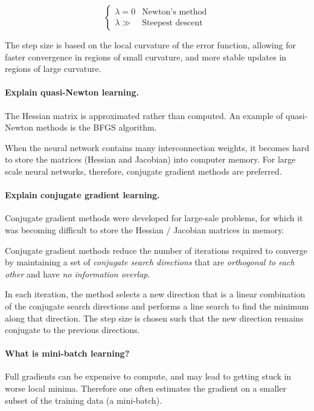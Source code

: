 $$
\begin{cases}
    \lambda = 0 & \text{Newton's method} \\
    \lambda \gg & \text{Steepest descent}
\end{cases}
$$

The step size is based on the local curvature of the error function, allowing
for faster convergence in regions of small curvature, and more stable updates in regions of large curvature.

\paragraph{Explain quasi-Newton learning.}

The Hessian matrix is approximated rather than computed.
An example of quasi-Newton methods is the BFGS algorithm.

When the neural network contains many interconnection weights, it becomes hard to store the matrices
(Hessian and Jacobian) into computer memory. For large scale neural networks, therefore, conjugate
gradient methods are preferred.

\paragraph{Explain conjugate gradient learning.}

Conjugate gradient methods were developed for large-sale problems,
for which it was becoming difficult to store the Hessian / Jacobian matrices in memory.

Conjugate gradient methods reduce the number of iterations required to converge
by maintaining a set of \textit{conjugate search directions} that are
\textit{orthogonal to each other} and have \textit{no information overlap}.

In each iteration, the method selects a new direction that is a
linear combination of the conjugate search directions and performs
a line search to find the minimum along that direction.
The step size is chosen such that the new direction remains
conjugate to the previous directions.

\paragraph{What is mini-batch learning?}

Full gradients can be expensive to compute, and may lead to getting
stuck in worse local minima. Therefore one often estimates the gradient
on a smaller subset of the training data (a mini-batch).

